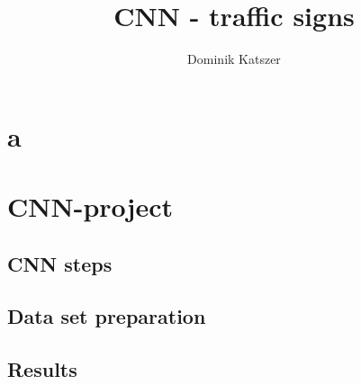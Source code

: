 \documentclass[]{report}
\title{CNN - traffic signs}
\author{Dominik Katszer}
\begin{document}
\maketitle
\section{a}

\section{CNN-project}
\subsection{CNN steps}
\subsection{Data set preparation}
\subsection{Results}
\end{document}
